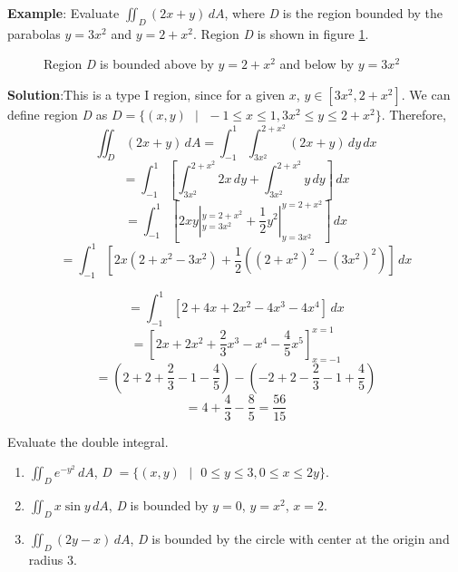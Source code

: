 \textbf{Example}: Evaluate $\iint_{\textit{D}} (2x + y)\,dA$, where \textit{D} 
is the region bounded by the parabolas $y = 3x^2$ and $y = 2 + x^2$. Region 
\textit{D} is shown in figure \ref{fig:parabola}. 

\begin{figure}[htbp]
\centering
    \caption{Region \textit{D} is bounded above by $y = 2 + x^2$ and below by 
    $y = 3x^2$}
    \label{fig:parabola}
\end{figure}

\textbf{Solution}:This is a type I region, since for a given $x$, $y \in \left[
3x^2, 2 + x^2 \right]$. We can define region \textit{D} as $\textit{D} = \{(x, 
y) \text{ }|\text{ } -1 \leq x \leq 1, 3x^2 \leq y \leq 2 + x^2 \}$. Therefore, 
$$\iint_{\textit{D}} (2x + y)\,dA = \int_{-1}^1 \int_{3x^2}^{2 + x^2} \left(2x 
+ y \right)\,dy\,dx$$
$$= \int_{-1}^1 \left[ \int_{3x^2}^{2 + x^2} 2x\,dy + \int_{3x^2}^{2 + x^2} y
\,dy \right]\,dx$$
$$= \int_{-1}^{1} \left[ 2xy|_{y = 3x^2}^{y = 2 + x^2} + \frac{1}{2}y^2|_{y = 
3x^2}^{y = 2+x^2} \right]\,dx$$
$$= \int_{-1}^1 \left[ 2x \left( 2 + x^2 - 3x^2 \right) + \frac{1}{2} \left( 
(2 + x^2)^2 - (3x^2)^2 \right) \right]\,dx$$

$$= \int_{-1}^1 \left[ 2 + 4x + 2x^2 - 4x^3 - 4x^4 \right]\,dx$$
$$= \left[ 2x + 2x^2 + \frac{2}{3}x^3 - x^4 - \frac{4}{5}x^5 \right]_{x = -1}^{
x = 1}$$
$$= \left( 2 + 2 + \frac{2}{3} - 1 - \frac{4}{5} \right) - \left( -2 + 2 - 
\frac{2}{3} - 1 + \frac{4}{5} \right)$$
$$= 4 + \frac{4}{3} - \frac{8}{5} = \frac{56}{15}$$

\begin{Exercise}[title = {Double Integrals over Non-Rectangular Regions}, 
label = non-rect]
Evaluate the double integral.
\begin{enumerate}
\item $\iint_{\textit{D}} e^{-y^2} \,dA$, \textit{D} $= \{(x, y) \text{ } | 
\text{ } 0 \leq y \leq 3, 0 \leq x \leq 2y \}$.
\item $\iint_{\textit{D}} x \sin{y}\,dA$, \textit{D} is bounded by $y = 0$, 
$y = x^2$, $x = 2$. 
\item $\iint_{\textit{D}} \left(2y - x \right)\,dA$, \textit{D} is bounded by 
the circle with center at the origin and radius 3. 
\end{enumerate}
\end{Exercise}

